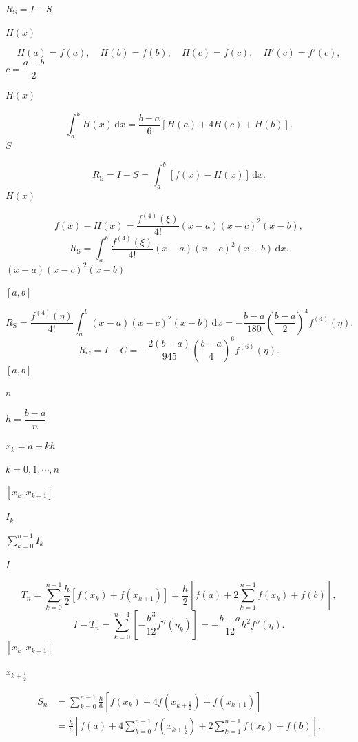 \documentclass[UTF8,fontset=fandol]{ctexart}
\begin{document}
$R_{\mathrm{S}}=I-S$\par
$H(x)$\par
\[ 
H(a)=f(a),\quad H(b)=f(b),\quad H(c)=f(c),\quad H'(c)=f'(c),
\tag{4.2.6}
 \]
$c=\dfrac{a+b}{2}$\par
$H(x)$\par
\[ 
\int_a^b H(x)\,\mathrm{d}x=\frac{b-a}{6}[H(a)+4H(c)+H(b)].
 \]
$S$\par
\[ 
R_{\mathrm{S}}=I-S=\int_a^b[f(x)-H(x)]\,\mathrm{d}x.
 \]
$H(x)$\par
\[ 
f(x)-H(x)=\frac{f^{(4)}(\xi)}{4!}(x-a)(x-c)^2(x-b),
 \]
\[ 
R_{\mathrm{S}}=\int_a^b\frac{f^{(4)}(\xi)}{4!}(x-a)(x-c)^2(x-b)\,\mathrm{d}x.
 \]
$(x-a)(x-c)^2(x-b)$\par
$[a,b]$\par
\[ 
R_{\mathrm{S}}=\frac{f^{(4)}(\eta)}{4!}\int_a^b(x-a)(x-c)^2(x-b)\,\mathrm{d}x
=-\frac{b-a}{180}\left(\frac{b-a}{2}\right)^4f^{(4)}(\eta).
\tag{4.2.7}
 \]
\[ 
R_{\mathrm{C}}=I-C=-\frac{2(b-a)}{945}\left(\frac{b-a}{4}\right)^6f^{(6)}(\eta).
\tag{4.2.8}
 \]
$[a,b]$\par
$n$\par
$h=\dfrac{b-a}{n}$\par
$x_k=a+kh$\par
$k=0,1,\cdots,n$\par
$[x_k,x_{k+1}]$\par
$I_k$\par
$\displaystyle\sum_{k=0}^{n-1}I_k$\par
$I$\par
\[ 
T_n=\sum_{k=0}^{n-1}\frac h2[f(x_k)+f(x_{k+1})]
=\frac h2\left[f(a)+2\sum_{k=1}^{n-1}f(x_k)+f(b)\right],
\tag{4.2.9}
 \]
\[ 
I-T_n=\sum_{k=0}^{n-1}\left[-\frac{h^3}{12}f''(\eta_k)\right]
=-\frac{b-a}{12}h^2f''(\eta).
\tag{4.2.10}
 \]
$[x_k,x_{k+1}]$\par
$x_{k+\frac12}$\par
\[ 
\begin{aligned}
S_n&=\sum_{k=0}^{n-1}\frac h6[f(x_k)+4f(x_{k+\frac12})+f(x_{k+1})]\\
&=\frac h6\left[f(a)+4\sum_{k=0}^{n-1}f(x_{k+\frac12})+2\sum_{k=1}^{n-1}f(x_k)+f(b)\right].
\end{aligned}
\tag{4.2.11}
 \]
\end{document}
